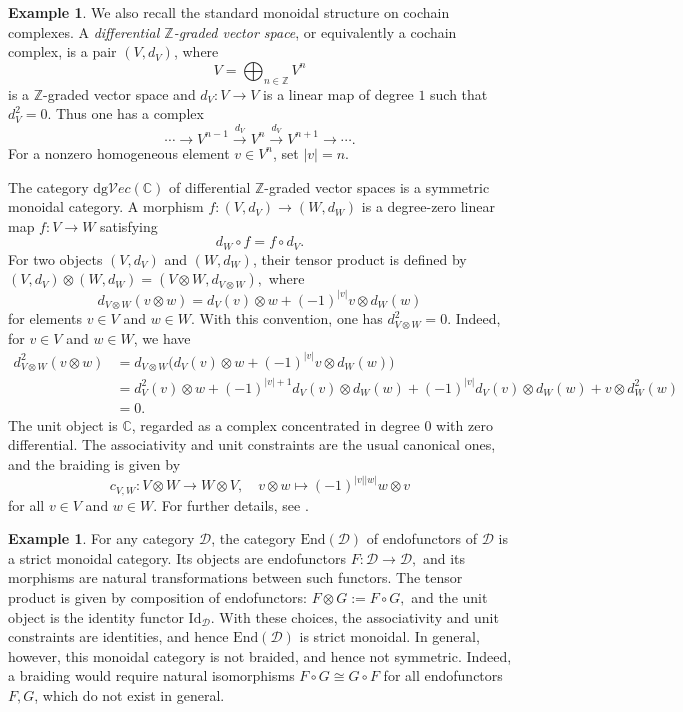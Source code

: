 \documentclass[11pt]{amsart}
\theoremstyle{definition}
\newtheorem{exam}[theo]{Example}
\numberwithin{equation}{section}
\begin{document}
\begin{exam}
We also recall the standard monoidal structure on cochain complexes. A \emph{differential $\mathbb{Z}$-graded vector space}, or equivalently a cochain complex, is a pair $(V,d_V)$, where
\[
V=\bigoplus_{n\in \mathbb{Z}}V^n
\]
is a $\mathbb{Z}$-graded vector space and $d_V:V\to V$ is a linear map of degree $1$ such that $d_V^2=0$. Thus one has a complex
\[
\cdots
\longrightarrow
V^{n-1}
\overset{d_V}{\longrightarrow}
V^n
\overset{d_V}{\longrightarrow}
V^{n+1}
\longrightarrow
\cdots .
\]
For a nonzero homogeneous element $v \in V^n$, set $|v|=n$.

The category $\mathrm{dg}\mathcal{V}ec(\mathbb{C})$ of differential $\mathbb{Z}$-graded vector spaces is a symmetric monoidal category. A morphism $f:(V,d_V)\longrightarrow (W,d_W)$
is a degree-zero linear map $f:V\to W$ satisfying
\[
d_W\circ f=f\circ d_V.
\]
For two objects $(V,d_V)$ and $(W,d_W)$, their tensor product is defined by $(V,d_V)\otimes (W,d_W)
=
(V\otimes W,d_{V\otimes W}),$
where
\[
d_{V\otimes W}(v\otimes w)
=
d_V(v)\otimes w
+
(-1)^{|v|}v\otimes d_W(w)
\]
for elements $v\in V$ and $w\in W$. With this convention, one has
$d_{V\otimes W}^2=0.$
Indeed, for $v\in V$ and $w\in W$, we have 
\[
\begin{aligned}
	d_{V\otimes W}^2(v\otimes w)
	&=
	d_{V\otimes W}\bigl(d_V(v)\otimes w
	+
	(-1)^{|v|}v\otimes d_W(w)\bigr)  \\
	&=
	d_V^2(v)\otimes w
	+
	(-1)^{|v|+1}d_V(v)\otimes d_W(w)
	+
	(-1)^{|v|}d_V(v)\otimes d_W(w)
	+
	v\otimes d_W^2(w)  \\
	&=0.
\end{aligned}
\]  
The unit object is $\mathbb{C}$, regarded as a complex concentrated in degree $0$ with zero differential. 
The associativity and unit constraints are the usual canonical ones, and the braiding is given by
\[
c_{V,W}:V\otimes W\longrightarrow W\otimes V,
\quad
v\otimes w\longmapsto (-1)^{|v||w|}w\otimes v
\]
for all $v\in V$ and $w \in W$.  For further details, see \cite{Kel06}.
\end{exam}
		
		
\begin{exam}
For any category $\mathcal{D}$, the category $\mathrm{End}(\mathcal{D})$ of endofunctors of $\mathcal{D}$ is a strict monoidal category. Its objects are endofunctors
$F:\mathcal{D}\longrightarrow \mathcal{D},$
and its morphisms are natural transformations between such functors. The tensor product is given by composition of endofunctors: $F\otimes G:=F\circ G,$
and the unit object is the identity functor $\mathrm{Id}_{\mathcal{D}}$. 
With these choices, the associativity and unit constraints are identities, and hence $\mathrm{End}(\mathcal{D})$ is strict monoidal. In general, however, this monoidal category is not braided, and hence not symmetric. Indeed, a braiding would require natural isomorphisms $F\circ G \cong G\circ F$
for all endofunctors $F,G$, which do not exist in general.
\end{exam}
		
\end{document}
